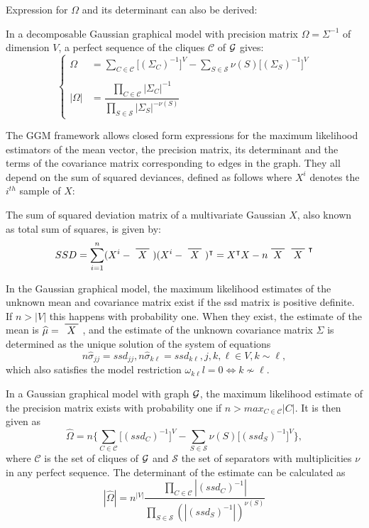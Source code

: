 Expression for $\Omega$ and its determinant can also be derived: 
 \begin{lemma} In a decomposable Gaussian graphical model with precision matrix $\Omega = \Sigma^{-1}$ of dimension $V$, a perfect sequence of the cliques $\mathcal{C}$ of $\mathcal{G}$ gives:
 \begin{equation*}
 \left\{
 \begin{array}{rl}
 \Omega &= \sum_{C\in \mathcal{C}} \big[(\Sigma_C)^{-1}\big]^V - \sum_{S\in \mathcal{S}} \nu(S)  \big[(\Sigma_S)^{-1}\big]^V \\\\
 |\Omega| &=\dfrac{\prod_{C\in \mathcal{C}} |\Sigma_C|^{-1}}{\prod_{S\in \mathcal{S}} |\Sigma_S|^{-\nu(S)}}
 \end{array} \right.
\end{equation*}  
\end{lemma}

The GGM framework allows closed form expressions for the maximum likelihood estimators of the mean vector, the precision matrix, its determinant and the terms of the covariance matrix corresponding to edges in the graph. They all depend on the sum of squared deviances, defined as follows where $X^i$ denotes the $i^{th}$ sample of $X$:
\begin{definition}
The sum of squared deviation matrix of a multivariate Gaussian $X$, also known as total sum of squares,  is given by:
$$SSD = \sum_{i=1}^n (X^i - \xbar{X})(X^i - \xbar{X})^\intercal = X^\intercal X - n  \xbar{X} \xbar{X}^\intercal$$
\end{definition}
\begin{theorem}
In the Gaussian graphical model,  the maximum likelihood estimates of the unknown mean and covariance matrix exist if the ssd matrix is positive definite. If $n>|V|$ this happens with probability one. When they exist, the estimate of the mean is $\widehat{\mu} = \xbar{X}$, and the estimate of the unknown covariance matrix $\Sigma$ is determined as the unique solution of the system of equations
$$n\widehat{\sigma}_{jj} = ssd_{jj}, n\widehat{\sigma}_{k\ell} = ssd_{k\ell}, j,k,\ell \in V, k\sim\ell,$$
which also satisfies the model restriction $\omega_{k\ell}l =0 \iff k\nsim \ell $.
\end{theorem}

\begin{theorem}
In a Gaussian graphical model with graph $\mathcal{G}$, the maximum likelihood estimate of the precision matrix exists with probability one if $n>max_{C\in\mathcal{C}}|C|$. It is then given as
$$\widehat{\Omega} = n \bigg\{\sum_{C\in\mathcal{C}} \big[(ssd_C)^{-1}\big]^V-\sum_{S\in\mathcal{S}} \nu(S) \big[(ssd_S)^{-1}\big]^V \bigg\},$$
where $\mathcal{C}$ is the set of cliques of $\mathcal{G}$ and $\mathcal{S}$ the set of separators with multiplicities $\nu$ in any perfect sequence. The determinant of the estimate can be calculated as
$$|\widehat{\Omega}| = n^{|V|} \dfrac{\prod_{C\in\mathcal{C}}|(ssd_C)^{-1}|}{\prod_{S\in\mathcal{S}} (|(ssd_S)^{-1}|)^{\nu(S)}}$$
\end{theorem}
 
